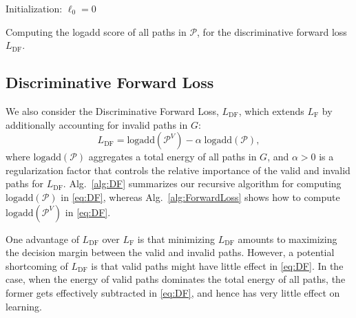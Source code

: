 \documentclass[10pt,twocolumn,letterpaper]{article}
\begin{document}
\begin{algorithm}[t]
\SetAlgoLined
{}
Initialization: $\ell_0 = 0$ \;
\caption{Computing the logadd score of all paths in $\mathcal{P}$, for  the discriminative forward loss $L_\text{DF}$. }
\label{alg:DF}
\end{algorithm}



\subsection{Discriminative Forward Loss}
We also consider the Discriminative Forward Loss, $L_\text{DF}$, which extends $L_\text{F}$ by additionally accounting for invalid paths in $G$:
\begin{equation}
  L_\text{DF} = \text{logadd}(\mathcal{P}^V) - \alpha\; \text{logadd}(\mathcal{P}),
  \label{eq:DF}
\end{equation}
where $\text{logadd}(\mathcal{P})$ aggregates  a total energy of all paths in $G$, and  $\alpha>0$ is a regularization factor that controls the relative importance of the valid and invalid paths for $L_\text{DF}$. Alg.~\ref{alg:DF} summarizes our recursive algorithm for computing $\text{logadd}(\mathcal{P})$ in \eqref{eq:DF}, whereas Alg.~\ref{alg:ForwardLoss} shows how to compute $\text{logadd}(\mathcal{P}^V)$ in \eqref{eq:DF}.  

One advantage of $L_\text{DF}$ over $L_\text{F}$ is that minimizing $L_\text{DF}$ amounts to  maximizing the decision margin between the valid and invalid paths. However, a potential shortcoming of $L_\text{DF}$ is that valid paths might have little effect in \eqref{eq:DF}. In the case, when the energy of valid paths dominates the total energy of all paths, the former gets effectively subtracted in \eqref{eq:DF}, and hence has very little effect on learning. 
\end{document}
